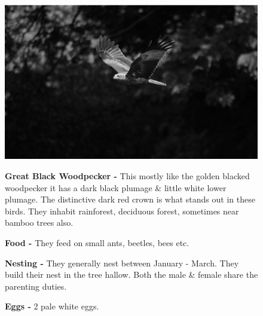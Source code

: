 \begin{figure}[H]
\begin{center}
\includegraphics{figure/Land_birds/01_pariah_kite/pariah-kite.eps}
\end{center}
\medskip
\noindent
{\bf Great Black Woodpecker -} This mostly like the golden blacked woodpecker it has a dark black plumage \& little white lower plumage. The distinctive dark red crown is what stands out in these birds. They  inhabit rainforest, deciduous forest, sometimes near bamboo trees also.

\medskip
{\bf Food -} They feed on small ants, beetles, bees etc.

{\bf Nesting -} They generally nest between January - March. They build their nest in the tree hallow. Both the male \& female share the parenting duties.

{\bf Eggs -} 2 pale white eggs.
\end{figure}

\vfill\eject

~\phantom{a}
\vfill


